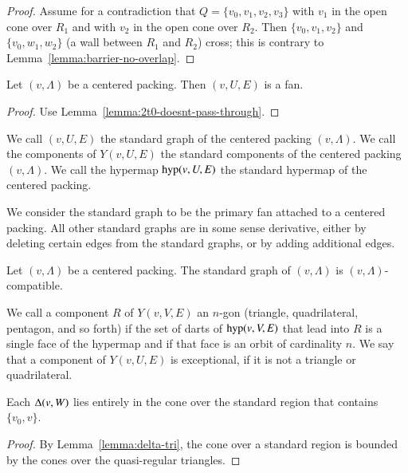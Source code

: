 \begin{proof}  Assume for a contradiction that $Q=\{v_0,v_1,v_2,v_3\}$
with $v_1$ in the open cone over $R_1$ and with $v_2$ in the open
cone over $R_2$.  Then $\{v_0,v_1,v_2\}$ and $\{v_0,w_1,w_2\}$ (a wall
between $R_1$ and $R_2$) cross;  this is contrary to
Lemma~\ref{lemma:barrier-no-overlap}.
\end{proof}

\begin{lemma}
Let $(v,\Lambda)$ be a centered packing.  Then
$(v,U,E)$ is a fan.
\end{lemma}

\begin{proof}
Use Lemma~\ref{lemma:2t0-doesnt-pass-through}.
\end{proof}

\begin{definition}  We call $(v,U,E)$ the standard
graph of the centered packing $(v,\Lambda)$.   We call the
components of $Y(v,U,E)$ the standard components of the centered
packing $(v,\Lambda)$.  We call the hypermap ${\operatorname{hyp}}(v,U,E)$
the standard hypermap of the centered packing.  
\end{definition}

We consider the standard graph  to be the
primary fan attached to a centered packing.  All other
standard graphs are in some sense derivative, either by deleting
certain edges from the standard graphs, or by adding additional
edges.


\begin{lemma}
Let $(v,\Lambda)$ be a centered packing.  The standard graph
of $(v,\Lambda)$ is $(v,\Lambda)$-compatible.
\end{lemma}

\begin{definition}  We call a component $R$ of $Y(v,V,E)$ an
$n$-gon (triangle, quadrilateral, pentagon, and so forth) if
the set of darts of ${\operatorname{hyp}}(v,V,E)$ that lead into $R$ is
a single face of the hypermap and if that face is an orbit of
cardinality $n$.   We say that
a component of $Y(v,U,E)$ is exceptional, if it is not a
triangle or quadrilateral.
\end{definition}


\begin{lemma}
Each $\Delta(v,W)$ lies entirely in the cone over the standard
region that contains $\{v_0,v\}$.
\end{lemma}

\begin{proof}
By Lemma~\ref{lemma:delta-tri},
the cone over a standard region is bounded by the cones  over the
quasi-regular triangles.
\end{proof}

